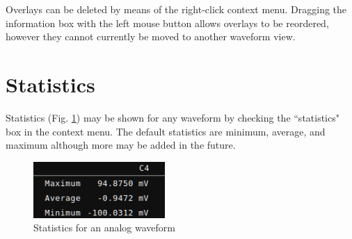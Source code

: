 Overlays can be deleted by means of the right-click context menu. Dragging the information box with the left mouse
button allows overlays to be reordered, however they cannot currently be moved to another waveform view.

\section{Statistics}

Statistics (Fig. \ref{stats}) may be shown for any waveform by checking the ``statistics" box in the context menu. The
default statistics are minimum, average, and maximum although more may be added in the future.


\begin{figure}[H]
\centering
\includegraphics[width=5cm]{images/stats.png}
\caption{Statistics for an analog waveform}
\label{stats}
\end{figure}

